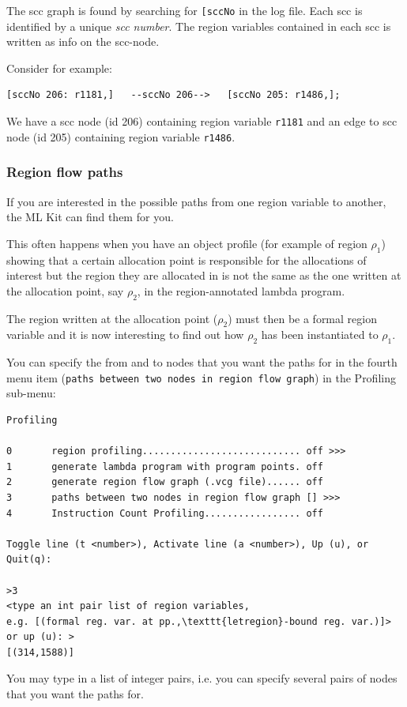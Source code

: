 \documentclass[12pt]{book}
\begin{document}
The scc graph is found by searching for \texttt{[sccNo} in the log
file. Each scc is identified by a unique \emph{scc number}. The region
variables contained in each scc is written as info on the scc-node.

Consider for example:
\begin{verbatim}
[sccNo 206: r1181,]   --sccNo 206-->   [sccNo 205: r1486,];
\end{verbatim}
\noindent
We have a scc node (id 206) containing region variable \texttt{r1181} and
an edge to scc node (id 205) containing region variable
\texttt{r1486}.

\subsubsection{Region flow paths\label{regFlowPath.sec}}
If you are interested in the possible paths
%
from one region variable to another, the ML Kit can find them for you.

This often happens when you have an object profile (for example of
region $\rho_1$) showing that a certain allocation point is
responsible for the allocations of interest but the region they are
allocated in is not the same as the one written at the allocation
point, say $\rho_2$, in the region-annotated lambda program.

The region written at the allocation point ($\rho_2$) must then be a formal
region variable and it is now interesting to find out how $\rho_2$ has been
instantiated to $\rho_1$.

You can specify the from and to nodes that you want the paths for in the
fourth menu item 
%
(\texttt{paths between two nodes in region flow graph}) in the
Profiling sub-menu:

\begin{footnotesize}
\begin{verbatim}
Profiling

0       region profiling............................ off >>>
1       generate lambda program with program points. off
2       generate region flow graph (.vcg file)...... off
3       paths between two nodes in region flow graph [] >>>
4       Instruction Count Profiling................. off

Toggle line (t <number>), Activate line (a <number>), Up (u), or Quit(q): 

>3
<type an int pair list of region variables,
e.g. [(formal reg. var. at pp.,\texttt{letregion}-bound reg. var.)]> or up (u): >
[(314,1588)]
\end{verbatim}
\end{footnotesize}
\noindent
You may type in a list of integer pairs, i.e. you can specify several
pairs of nodes that you want the paths for.
\end{document}
